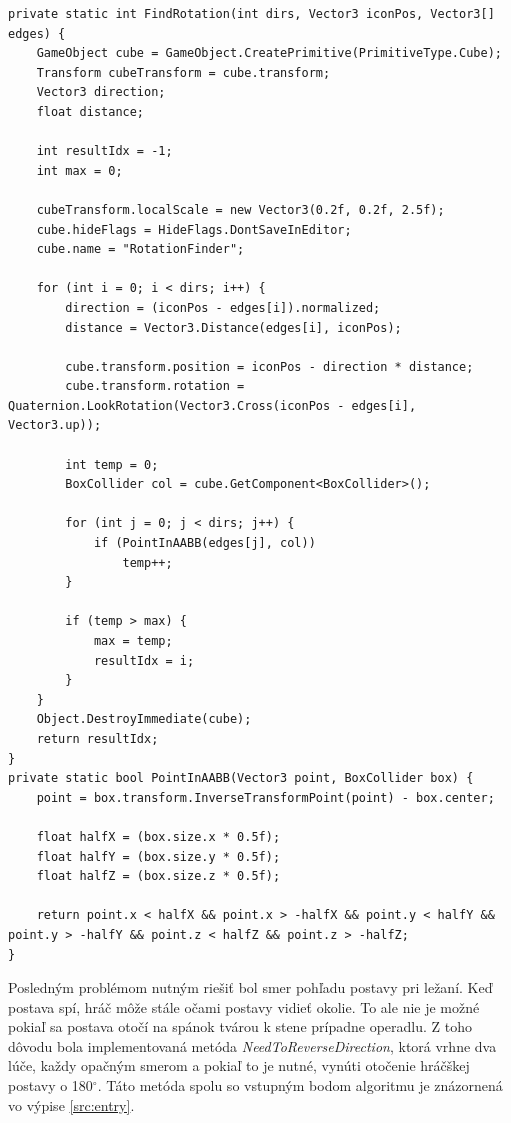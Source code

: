 \documentclass[slovak, bachelorpractice]{diploma}
\begin{document}
\vspace{10pt}
\begin{lstlisting}[label=src:findRot,caption={Získanie korektnej rotácie hráčskej postavy pri ležaní}]
private static int FindRotation(int dirs, Vector3 iconPos, Vector3[] edges) {
    GameObject cube = GameObject.CreatePrimitive(PrimitiveType.Cube);
    Transform cubeTransform = cube.transform;
    Vector3 direction;
    float distance;
    
    int resultIdx = -1;
    int max = 0;
    
    cubeTransform.localScale = new Vector3(0.2f, 0.2f, 2.5f);
    cube.hideFlags = HideFlags.DontSaveInEditor;
    cube.name = "RotationFinder";
    
    for (int i = 0; i < dirs; i++) {
        direction = (iconPos - edges[i]).normalized;
        distance = Vector3.Distance(edges[i], iconPos);

        cube.transform.position = iconPos - direction * distance;
        cube.transform.rotation = Quaternion.LookRotation(Vector3.Cross(iconPos - edges[i], Vector3.up));

        int temp = 0;
        BoxCollider col = cube.GetComponent<BoxCollider>();
        
        for (int j = 0; j < dirs; j++) {
            if (PointInAABB(edges[j], col))
                temp++;
        }

        if (temp > max) {
            max = temp;
            resultIdx = i;
        }
    }
    Object.DestroyImmediate(cube);
    return resultIdx;
}
private static bool PointInAABB(Vector3 point, BoxCollider box) {
    point = box.transform.InverseTransformPoint(point) - box.center;

    float halfX = (box.size.x * 0.5f);
    float halfY = (box.size.y * 0.5f);
    float halfZ = (box.size.z * 0.5f);

    return point.x < halfX && point.x > -halfX && point.y < halfY && point.y > -halfY && point.z < halfZ && point.z > -halfZ;
}
\end{lstlisting}

Posledným problémom nutným riešiť bol smer pohľadu postavy pri ležaní. Keď postava spí, hráč môže stále očami postavy vidieť okolie. To ale nie je možné pokiaľ sa postava otočí na spánok tvárou k stene prípadne operadlu. Z toho dôvodu bola implementovaná metóda \textit{NeedToReverseDirection}, ktorá vrhne dva lúče, každy opačným smerom a pokiaľ to je nutné, vynúti otočenie hráčškej postavy o 180$^{\circ}$. Táto metóda spolu so vstupným bodom algoritmu je znázornená vo výpise \ref{src:entry}.
\end{document}
